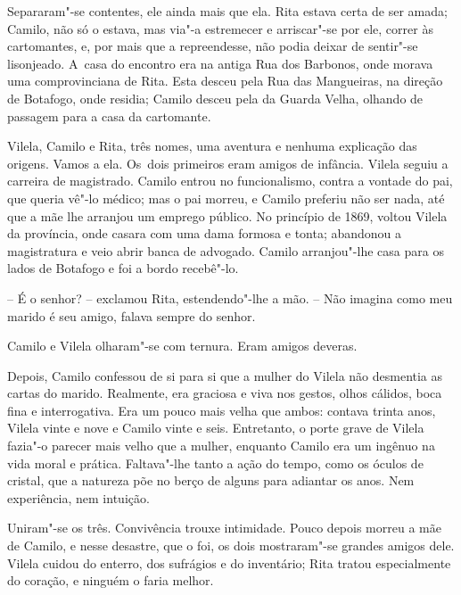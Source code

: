 Separaram"-se contentes, ele ainda mais que ela. Rita estava certa de ser
amada; Camilo, não só o estava, mas via"-a estremecer e arriscar"-se por
ele, correr às cartomantes, e, por mais que a repreendesse, não podia
deixar de sentir"-se lisonjeado. A~casa do encontro era na antiga Rua dos
Barbonos, onde morava uma comprovinciana de Rita. Esta desceu pela Rua
das Mangueiras, na direção de Botafogo, onde residia; Camilo desceu pela
da Guarda Velha, olhando de passagem para a casa da cartomante.

Vilela, Camilo e Rita, três nomes, uma aventura e nenhuma explicação das
origens. Vamos a ela. Os~dois primeiros eram amigos de infância. Vilela
seguiu a carreira de magistrado. Camilo entrou no funcionalismo, contra
a vontade do pai, que queria vê"-lo médico; mas o pai morreu, e Camilo
preferiu não ser nada, até que a mãe lhe arranjou um emprego público. No
princípio de 1869, voltou Vilela da província, onde casara com uma dama
formosa e tonta; abandonou a magistratura e veio abrir banca de
advogado. Camilo arranjou"-lhe casa para os lados de Botafogo e foi a
bordo recebê"-lo.

-- É o senhor? -- exclamou Rita, estendendo"-lhe a mão. -- Não imagina
como meu marido é seu amigo, falava sempre do senhor.

Camilo e Vilela olharam"-se com ternura. Eram amigos deveras.

Depois, Camilo confessou de si para si que a mulher do Vilela não
desmentia as cartas do marido. Realmente, era graciosa e viva nos
gestos, olhos cálidos, boca fina e interrogativa. Era um pouco mais
velha que ambos: contava trinta anos, Vilela vinte e nove e Camilo vinte
e seis. Entretanto, o porte grave de Vilela fazia"-o parecer mais velho
que a mulher, enquanto Camilo era um ingênuo na vida moral e prática.
Faltava"-lhe tanto a ação do tempo, como os óculos de cristal, que a
natureza põe no berço de alguns para adiantar os anos. Nem experiência,
nem intuição.

Uniram"-se os três. Convivência trouxe intimidade. Pouco depois morreu a
mãe de Camilo, e nesse desastre, que o foi, os dois mostraram"-se grandes
amigos dele. Vilela cuidou do enterro, dos sufrágios e do inventário;
Rita tratou especialmente do coração, e ninguém o faria melhor.

